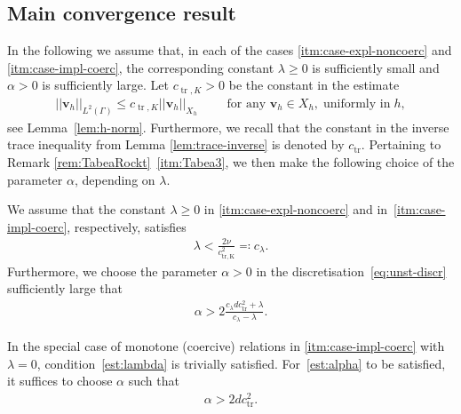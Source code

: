 \documentclass[reqno,a4paper]{amsart}
\def\norm#1{\left|\!\left| #1 \right|\!\right|}
\def\vec#1{\boldsymbol{#1}}
\def\tr{\mathop{\mathrm{tr}}\nolimits}
\def\bv{\vec{v}}
\begin{document}
\subsection{Main convergence result}\label{sec:unst-main}
In the following we assume that, in each of the cases \ref{itm:case-expl-noncoerc} and \ref{itm:case-impl-coerc}, the corresponding constant $\lambda\geq 0$ is sufficiently small and $\alpha>0$ is sufficiently large. 
Let $c_{\tr,K}>0$ be the constant in the estimate 
\begin{align}\label{est:tr-K}
	\norm{\bv_h}_{L^2(\Gamma)} \leq c_{\tr,K} \norm{\bv_h}_{X_h} \qquad \text{ for any } \bv_h \in X_h,\;\text{uniformly in}\;h, 
\end{align}
see Lemma~\ref{lem:h-norm}.  
Furthermore, we recall that the constant in the inverse trace inequality from Lemma \ref{lem:trace-inverse} is denoted by $c_{\tr}$. Pertaining to Remark \ref{rem:TabeaRockt}~\ref{itm:Tabea3}, we then make the following choice of the parameter $\alpha$, depending on $\lambda$. 

\begin{assumption}[parameters]\label{as:param}
	We assume that the constant $\lambda \geq 0$ in \ref{itm:case-expl-noncoerc} and in~\ref{itm:case-impl-coerc}, respectively, satisfies 
	\begin{align}\label{est:lambda}
		\lambda < \frac{2 \nu}{c_{\mathrm{tr,K}}^2} \eqqcolon c_\lambda. 
	\end{align}
	Furthermore, we choose the parameter $\alpha>0$ in the discretisation~\eqref{eq:unst-discr} sufficiently large that
	\begin{align}\label{est:alpha}
		\alpha >  2 \frac{c_\lambda d c_{\tr}^2 + \lambda}{c_{\lambda} - \lambda}. 
	\end{align}
\end{assumption}

In the special case of monotone (coercive) relations in \ref{itm:case-impl-coerc} with $\lambda = 0$, condition~\eqref{est:lambda} is trivially satisfied. For~\eqref{est:alpha} to be satisfied, it suffices to choose $\alpha$ such that 
\begin{align}\label{est:alpha-mon}
	\alpha>	2 d c_{\mathrm{tr}}^2. 
\end{align} 
\end{document}
